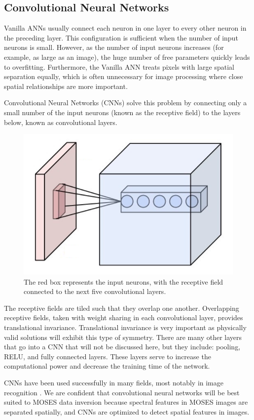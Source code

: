 \documentclass[twoside]{article}
\begin{document}
\begin{multicols}{2}
\subsection{Convolutional Neural Networks}
Vanilla ANNs usually connect each neuron in one layer to every other neuron in the preceding layer. This configuration is sufficient when the number of input neurons is small. However, as the number of input neurons increases (for example, as large as an image), the huge number of free parameters quickly leads to overfitting. Furthermore, the Vanilla ANN treats pixels with large spatial separation equally, which is often unnecessary for image processing where close spatial relationships are more important. \par Convolutional Neural Networks (CNNs) solve this problem by connecting only a small number of the input neurons (known as the receptive field) to the layers below, known as convolutional layers.
\begin{figure}[H]
	\centering
	\includegraphics[width=0.5\linewidth]{images/Conv_layer}
	\caption{The red box represents the input neurons, with the receptive field connected to the next five convolutional layers.}
\end{figure}
The receptive fields are tiled such that they overlap one another. Overlapping receptive fields, taken with weight sharing in each convolutional layer, provides translational invariance. Translational invariance is very important as physically valid solutions will exhibit this type of symmetry. There are many other layers that go into a CNN that will not be discussed here, but they include: pooling, RELU, and fully connected layers. These layers serve to increase the computational power and decrease the training time of the network. \par CNNs have been used successfully in many fields, most notably in image recognition \cite{imagenet}. We are confident that convolutional neural networks will be best suited to MOSES data inversion because spectral features in MOSES images are separated spatially, and CNNs are optimized to detect spatial features in images.


\end{multicols}
\end{document}
